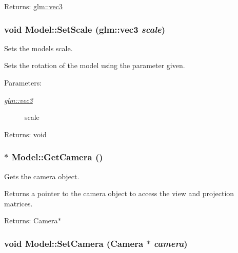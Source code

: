 \begin{Desc}
\item[Returns:]\hyperlink{group__core__types_g1c47e8b3386109bc992b6c48e91b0be7}{glm::vec3} \end{Desc}
\hypertarget{class_model_76860d36c983eb38250588899775aab7}{
\subsubsection[SetScale]{\setlength{\rightskip}{0pt plus 5cm}void Model::SetScale ({\bf glm::vec3} {\em scale})}}
\label{class_model_76860d36c983eb38250588899775aab7}


Sets the models scale. 

Sets the rotation of the model using the parameter given.

\begin{Desc}
\item[Parameters:]
\begin{description}
\item[{\em \hyperlink{group__core__types_g1c47e8b3386109bc992b6c48e91b0be7}{glm::vec3}}]scale \end{description}
\end{Desc}
\begin{Desc}
\item[Returns:]void \end{Desc}
\hypertarget{class_model_8c6429a35a1376657357e6e770470f13}{
\subsubsection[GetCamera]{$\ast$ Model::GetCamera ()}}
\label{class_model_8c6429a35a1376657357e6e770470f13}


Gets the camera object. 

Returns a pointer to the camera object to access the view and projection matrices.

\begin{Desc}
\item[Returns:]Camera$\ast$ \end{Desc}
\hypertarget{class_model_19b6689d4a5e80e187df85a5ab6f03b8}{
\subsubsection[SetCamera]{\setlength{\rightskip}{0pt plus 5cm}void Model::SetCamera ({\bf Camera} $\ast$ {\em camera})}}
\label{class_model_19b6689d4a5e80e187df85a5ab6f03b8}


